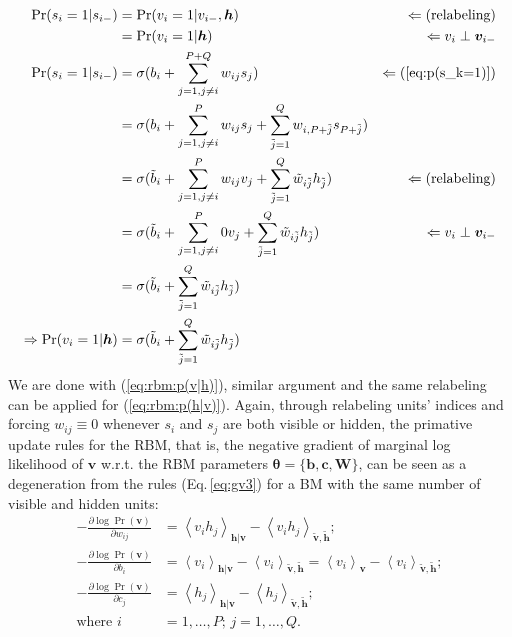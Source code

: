 \documentclass[11pt]{article}
\newcommand{\mean}[2]{\left\langle{#1}\right\rangle_{#2}}
\newcommand{\vb}{\boldsymbol{b}}
\newcommand{\vc}{\boldsymbol{c}}
\newcommand{\vh}{\boldsymbol{h}}
\newcommand{\vv}{\boldsymbol{v}}
\newcommand{\mw}{\boldsymbol{W}}
\newcommand{\vht}{\tilde{\vh}}
\newcommand{\vvt}{\tilde{\vv}}
\newcommand{\pEC}{\boldsymbol{\theta}}
\newcommand{\PDV}[2]{\frac{\partial #1}{\partial #2}}
\begin{document}
{\begin{align*}
  \Pr(s_i=1|s_{i-}) & = \Pr(v_i=1|v_{i-}, \vh)                                  & \Leftarrow (\textrm{relabeling}) \\
                    & = \Pr(v_i=1|\vh)                                          & \Leftarrow v_i \perp \vv_{i-}    \\
  \Pr(s_i=1|s_{i-}) & = \sigma(b_i + \sum_{j=1, j \ne i}^{P+Q}{w_{ij}s_j} )     & \Leftarrow (\ref{eq:p(s_k=1)})   \\
                    & = \sigma(b_i + \sum_{j=1, j \ne i}^P{w_{ij}s_j}
                      + \sum_{\jt=1}^{Q}{w_{i,P+\jt}s_{P+\jt}}) \\
                    & = \sigma(\bt_i + \sum_{j=1, j \ne i}^P{w_{ij}v_j}
                      + \sum_{\jt=1}^{Q}{\wt_{i\jt}h_{\jt}})                    & \Leftarrow (\textrm{relabeling}) \\
                    & = \sigma(\bt_i + \sum_{j=1, j \ne i}^P{0 v_j}
                      + \sum_{\jt=1}^{Q}{\wt_{i\jt}h_{\jt}})                    & \Leftarrow v_i \perp \vv_{i-} \\
                    & = \sigma(\bt_i + \sum_{\jt=1}^Q{\wt_{i\jt}h_{\jt}}) \\
  \Rightarrow \Pr(v_i=1|\vh) & = \sigma(\bt_i + \sum_{\jt=1}^Q{\wt_{i\jt}h_{\jt}})
\end{align*}
We are done with (\ref{eq:rbm:p(v|h)}), similar argument and the same relabeling can be applied for (\ref{eq:rbm:p(h|v)}). Again, through relabeling units' indices and forcing $w_{ij} \equiv 0$ whenever $s_i$ and $s_j$ are both visible or hidden, the primative update rules for the RBM, that is, the negative gradient of marginal log likelihood of $\vv$ w.r.t. the RBM parameters $\pEC=\{\vb, \vc, \mw\}$, can be seen as a degeneration from the rules (Eq.\,\ref{eq:gv3}) for a BM with the same number of visible and hidden units:
\begin{align*}
  -\PDV{\log{\Pr(\vv)}}{w_{ij}} & = \mean{v_i h_j}{\vh|\vv} - \mean{v_i h_j}{\vvt, \vht}; \\
  -\PDV{\log{\Pr(\vv)}}{b_i} & = \mean{v_i}{\vh|\vv} - \mean{v_i}{\vvt, \vht} = \mean{v_i}{\vv} - \mean{v_i}{\vvt, \vht}; \\
  -\PDV{\log{\Pr(\vv)}}{c_j} & = \mean{h_j}{\vh|\vv} - \mean{h_j}{\vvt, \vht}; \\
  \textrm{where } i & = 1, \dots, P;\, j = 1, \dots, Q.
\end{align*}

}
\end{document}
